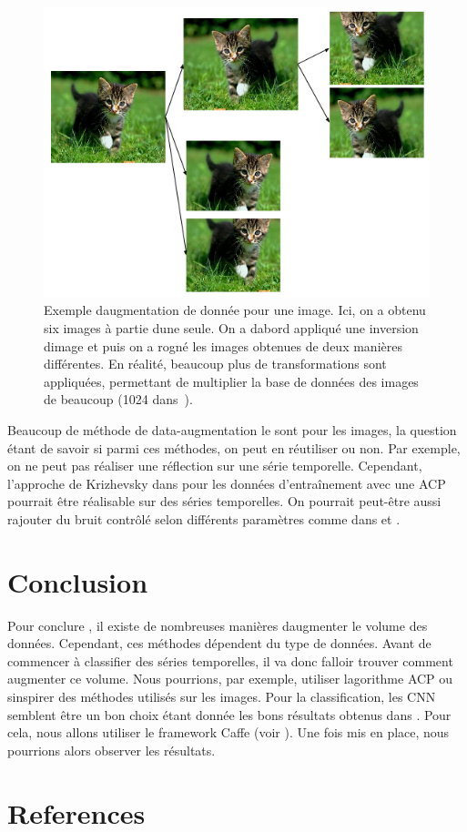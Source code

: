 \documentclass[11pt]{sdm}
\begin{document}
		\begin{figure}[!ht]
			\centering
			\includegraphics[scale=0.6,natwidth=528,natheight=397]{figures/dataAugmentationImage.png}
			\caption{Exemple d\textquotesingle augmentation de donn\'ee pour une image. Ici, on a obtenu six images \`a partie d\textquotesingle une seule. On a d\textquotesingle abord appliqu\'e une inversion d\textquotesingle image et puis on a rogn\'e les images obtenues de deux mani\`eres diff\'erentes. En r\'ealit\'e, beaucoup plus de transformations sont appliqu\'ees, permettant de multiplier la base de donn\'ees des images de beaucoup (1024 dans~\cite{howard2013some}).}
			\label{fig:dataAugmentationChat}
		\end{figure}

		Beaucoup de m\'ethode de data-augmentation le sont pour les images, la question \'etant de savoir si parmi ces m\'ethodes, on peut en r\'eutiliser ou non. Par exemple, on ne peut pas r\'ealiser une r\'eflection sur une s\'erie temporelle. Cependant, l’approche de Krizhevsky dans \cite{krizhevsky2012imagenet} pour les donn\'ees d’entra\^inement avec une ACP pourrait \^etre r\'ealisable sur des s\'eries temporelles. On pourrait peut-\^etre aussi rajouter du bruit contrôl\'e selon diff\'erents param\`etres comme dans \cite{krizhevsky2012imagenet} et \cite{howard2013some}.


\bigbreak
\bigbreak
\section{Conclusion}
Pour conclure , il existe de nombreuses mani\`eres d\textquotesingle augmenter le volume des donn\'ees. Cependant, ces m\'ethodes d\'ependent du type de donn\'ees. Avant de commencer \`a classifier des s\'eries temporelles, il va donc falloir trouver comment augmenter ce volume. Nous pourrions, par exemple, utiliser l\textquotesingle agorithme ACP ou s\textquotesingle inspirer des m\'ethodes utilis\'es sur les images.
Pour la classification, les CNN semblent \^etre un bon choix \'etant donn\'ee les bons r\'esultats obtenus dans \cite{zheng2014time}. Pour cela, nous allons utiliser le framework Caffe (voir \cite{jia2014caffe}). Une fois mis en place, nous pourrions alors observer les r\'esultats.

\section*{References}
	\nocite{*}
	
	
\end{document}
